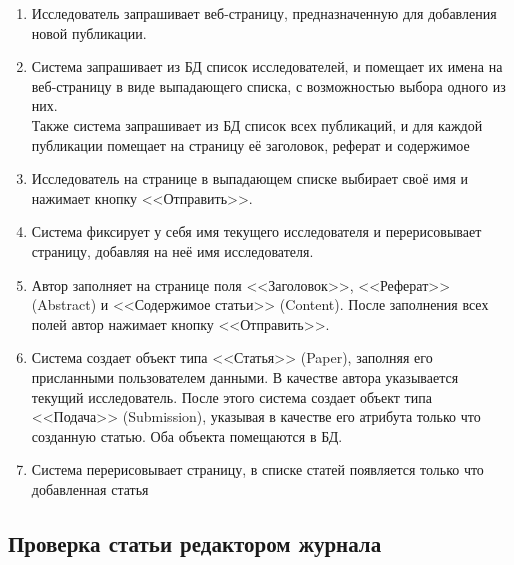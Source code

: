 \begin{enumerate}
\item Исследователь запрашивает веб-страницу, предназначенную для добавления новой публикации.
\item Система запрашивает из БД список исследователей, и помещает их имена на веб-страницу в виде выпадающего списка, с возможностью выбора одного из них.\\ Также система запрашивает из БД список всех публикаций, и для каждой публикации помещает на страницу её заголовок, реферат и содержимое
\item Исследователь на странице в выпадающем списке выбирает своё имя и нажимает кнопку <<Отправить>>.
\item Система фиксирует у себя имя текущего исследователя и перерисовывает страницу, добавляя на неё имя исследователя.
\item Автор заполняет на странице поля <<Заголовок>>, <<Реферат>> (Abstract) и <<Содержимое статьи>> (Content). После заполнения всех полей автор нажимает кнопку <<Отправить>>.
\item Система создает объект типа <<Статья>> (Paper), заполняя его присланными пользователем данными. В качестве автора указывается текущий исследователь. После этого система создает объект типа <<Подача>> (Submission), указывая в качестве его атрибута только что созданную статью. Оба объекта помещаются в БД.
\item Система перерисовывает страницу, в списке статей появляется только что добавленная статья
\end{enumerate}

\subsection{Проверка статьи редактором журнала}

